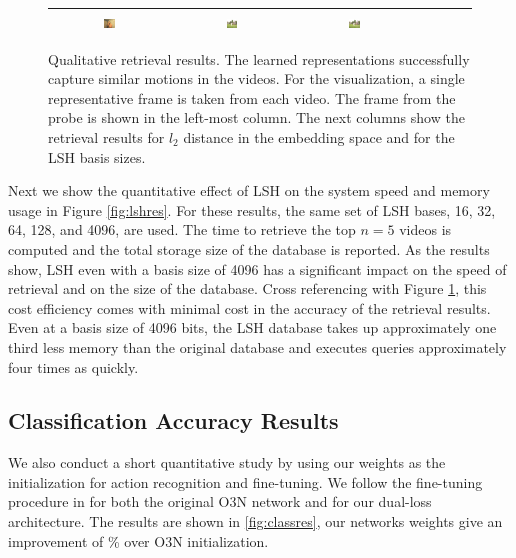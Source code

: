 \begin{figure}[t]
\begin{center}
\begin{tabular}{|c|c|ccccc|}
          \includegraphics[width=0.1\textwidth]{images/ret_results/writing/64.png} & 
          \includegraphics[width=0.1\textwidth]{images/ret_results/writing/128.png} & 
          \includegraphics[width=0.1\textwidth]{images/ret_results/writing/4096.png} \\ \hline            
        \end{tabular}
        \caption{Qualitative retrieval results. The learned representations successfully capture similar motions in the videos. For the visualization, a single representative frame is taken from each video. The frame from the probe is shown in the left-most column. The next columns show the retrieval results for $l_2$ distance in the embedding space and for the LSH basis sizes.  }
        \label{fig:retres}
    \end{center}
\end{figure}

Next we show the quantitative effect of LSH on the system speed and memory usage in Figure \ref{fig:lshres}. For these results, the same set of LSH bases, 16, 32, 64, 128, and 4096, are used. The time to retrieve the top $n=5$ videos is computed and the total storage size of the database is reported. As the results show, LSH even with a basis size of 4096 has a significant impact on the speed of retrieval and on the size of the database. Cross referencing with Figure \ref{fig:retres}, this cost efficiency comes with minimal cost in the accuracy of the retrieval results. Even at a basis size of 4096 bits, the LSH database takes up approximately one third less memory than the original database and executes queries approximately four times as quickly.

\subsection{Classification Accuracy Results}

We also conduct a short quantitative study by using our weights as the initialization for action recognition and fine-tuning. We follow the fine-tuning procedure in \cite{fernando2017self} for both the original O3N network and for our dual-loss architecture. The results are shown in \ref{fig:classres}, our networks weights give an improvement of \todo\% over O3N initialization.

